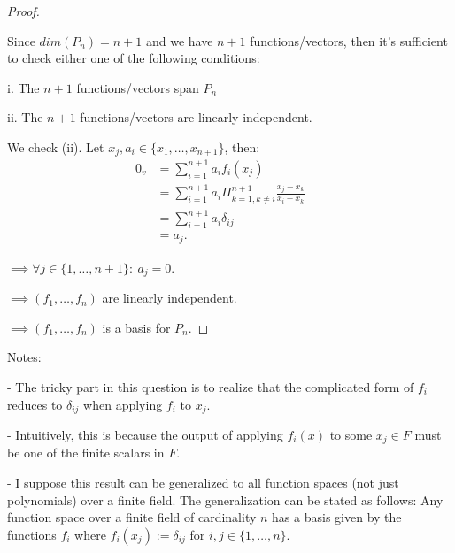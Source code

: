\documentclass{article}
\begin{document}
\begin{proof}
  $ $

  Since $dim(P_n) = n+1$ and we have $n+1$ functions/vectors, then it's sufficient to check either one of the following conditions: 
  
  \qquad i. The $n+1$ functions/vectors span $P_n$

  \qquad ii. The $n+1$ functions/vectors are linearly independent.
  \newline

  We check (ii). Let $x_j, a_i \in \{x_1,\ldots,x_{n+1}\}$, then:
  \begin{align*}
    0_v &= \sum_{i=1}^{n+1} a_i f_i(x_j) &&\\
    &= \sum_{i=1}^{n+1} a_i \Pi_{k=1, k \neq i}^{n+1}\frac{x_j - x_k}{x_i - x_k} &&\\
    &= \sum_{i=1}^{n+1} a_i \delta_{ij} &&\\
    &= a_j.
  \end{align*}

  \noindent
  $\implies \forall j \in \{1,\ldots,n+1\}: \  a_j = 0$.

  \noindent
  $\implies (f_1,\ldots,f_n)$ are linearly independent.

  \noindent
  $\implies (f_1,\ldots,f_n)$ is a basis for $P_n$.

\end{proof}

\noindent
Notes:

\quad - The tricky part in this question is to realize that the complicated form of $f_i$ reduces to $\delta_{ij}$ when applying $f_i$ to $x_j$.

\quad - Intuitively, this is because the output of applying $f_i(x)$ to some $x_j \in F$ must be one of the finite scalars in $F$.

\quad - I suppose this result can be generalized to all function spaces (not just polynomials) over a finite field. The generalization can be stated as follows: Any function space over a finite field of cardinality $n$ has a basis given by the functions $f_i$ where $f_i(x_j) := \delta_{ij}$ for $i,j \in \{1,\ldots,n\}$.
\newpage
\end{document}
